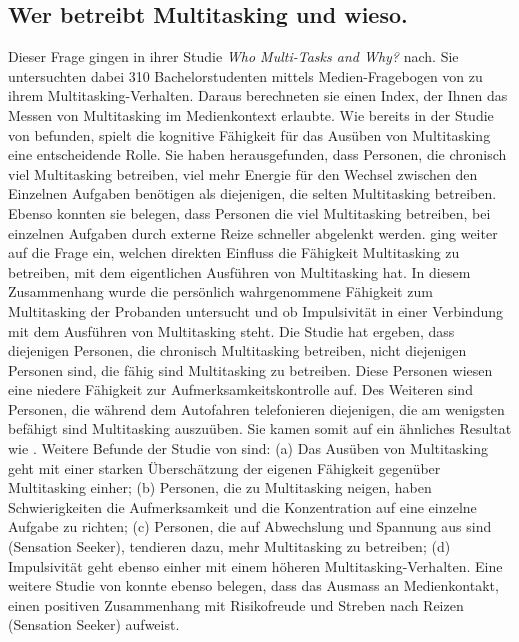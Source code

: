 \subsection{Wer betreibt Multitasking und wieso.} Dieser Frage gingen  in ihrer Studie \textit{Who Multi-Tasks and Why?} nach. Sie untersuchten dabei 310 Bachelorstudenten mittels Medien-Fragebogen von  zu ihrem Multitasking-Verhalten. Daraus berechneten sie einen Index, der Ihnen das Messen von Multitasking im Medienkontext erlaubte. Wie bereits in der Studie von  befunden, spielt die kognitive Fähigkeit für das Ausüben von Multitasking eine entscheidende Rolle. Sie haben herausgefunden, dass Personen, die chronisch viel Multitasking betreiben, viel mehr Energie für den Wechsel zwischen den Einzelnen Aufgaben benötigen als diejenigen, die selten Multitasking betreiben. Ebenso konnten sie belegen, dass Personen die viel Multitasking betreiben, bei einzelnen Aufgaben durch externe Reize schneller abgelenkt werden.  ging weiter auf die Frage ein, welchen direkten Einfluss die Fähigkeit Multitasking zu betreiben, mit dem eigentlichen Ausführen von Multitasking hat. In diesem Zusammenhang wurde die persönlich wahrgenommene Fähigkeit zum Multitasking der Probanden untersucht und ob Impulsivität in einer Verbindung mit dem Ausführen von Multitasking steht. Die Studie hat ergeben, dass diejenigen Personen, die chronisch Multitasking betreiben, nicht diejenigen Personen sind, die fähig sind Multitasking zu betreiben. Diese Personen wiesen eine niedere Fähigkeit zur Aufmerksamkeitskontrolle auf. Des Weiteren sind Personen, die während dem Autofahren telefonieren diejenigen, die am wenigsten befähigt sind Multitasking auszuüben. Sie kamen somit auf ein ähnliches Resultat wie . Weitere Befunde der Studie von  sind: (a) Das Ausüben von Multitasking geht mit einer starken Überschätzung der eigenen Fähigkeit gegenüber Multitasking einher; (b) Personen, die zu Multitasking neigen, haben Schwierigkeiten die Aufmerksamkeit und die Konzentration auf eine einzelne Aufgabe zu richten; (c) Personen, die auf Abwechslung und Spannung aus sind (Sensation Seeker), tendieren dazu, mehr Multitasking zu betreiben; (d) Impulsivität geht ebenso einher mit einem höheren Multitasking-Verhalten. Eine weitere Studie von  konnte ebenso belegen, dass das Ausmass an Medienkontakt, einen positiven Zusammenhang mit Risikofreude und Streben nach Reizen (Sensation Seeker) aufweist. 
